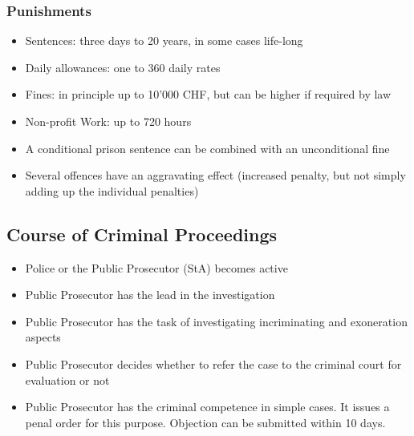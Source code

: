 \documentclass[11pt]{article}
\theoremstyle{definition}
\begin{document}
\subsubsection{Punishments}
\begin{itemize}
	\item Sentences: three days to 20 years, in some cases life-long
	\item Daily allowances: one to 360 daily rates
	\item Fines: in principle up to 10'000 CHF, but can be higher if required by law
	\item Non-profit Work: up to 720 hours
	\item A conditional prison sentence can be combined with an unconditional fine
	\item Several offences have an aggravating effect (increased penalty, but not simply adding up the individual penalties)
\end{itemize}

\subsection{Course of Criminal Proceedings}
\begin{itemize}
	\item Police or the Public Prosecutor (StA) becomes active
	\item Public Prosecutor has the lead in the investigation
	\item Public Prosecutor has the task of investigating incriminating and exoneration aspects
	\item Public Prosecutor decides whether to refer the case to the criminal court for evaluation or not
	\item Public Prosecutor has the criminal competence in simple cases. It issues a penal order for this purpose. Objection can be submitted within 10 days.
\end{itemize}
\end{document}
